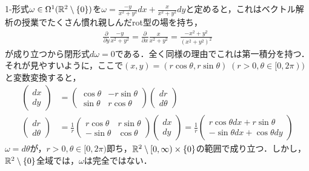 \documentclass[uplatex,dvipdfmx]{jsreport}
\begin{document}
\begin{example}[三角関数の微分が生成する1-形式]
    1-形式$\omega\in\Omega^1(\mathbb{R}^2\setminus\{0\})$を$\omega=\frac{-y}{x^2+y^2}dx+\frac{x}{x^2+y^2}dy$と定めると，これはベクトル解析の授業でたくさん慣れ親しんだrot型の場を持ち，
    \begin{align*}
        \frac{\partial}{\partial y}\frac{-y}{x^2+y^2}=\frac{\partial}{\partial x}\frac{x}{x^2+y^2}=\frac{-x^2+y^2}{(x^2+y^2)^2}
    \end{align*}
    が成り立つから閉形式$d\omega=0$である．全く同様の理由でこれは第一積分を持つ．それが見やすいように，ここで$(x,y)=(r\cos\theta,r\sin\theta)\;(r>0,\theta\in[0,2\pi))$と変数変換すると，
    \begin{align*}
        \begin{pmatrix}dx\\dy\end{pmatrix} &= \begin{pmatrix}\cos\theta&-r\sin\theta\\\sin\theta&r\cos\theta\end{pmatrix}\begin{pmatrix}dr\\d\theta\end{pmatrix}\\
        \begin{pmatrix}dr\\d\theta\end{pmatrix} &= \frac{1}{r}\begin{pmatrix}r\cos\theta&r\sin\theta\\-\sin\theta&\cos\theta\end{pmatrix}\begin{pmatrix}dx\\dy\end{pmatrix} = \frac{1}{r}\begin{pmatrix}r\cos\theta dx+r\sin\theta\\-\sin\theta dx+\cos\theta dy\end{pmatrix}
    \end{align*}
    $\omega=d\theta$が，$r>0,\theta\in[0,2\pi)$即ち，$\mathbb{R}^2\setminus [0,\infty)\times\{0\}$の範囲で成り立つ．しかし，$\mathbb{R}^2\setminus\{0\}$全域では，$\omega$は完全ではない．
\end{example}
\end{document}
